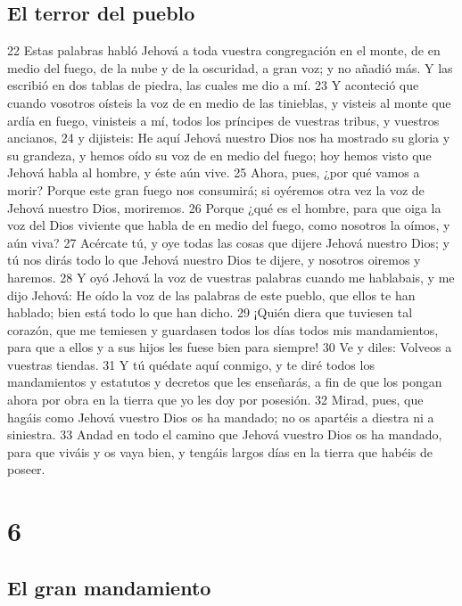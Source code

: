\section{El terror del pueblo }

22 Estas palabras habló Jehová a toda vuestra congregación en el monte, de en medio del fuego, de la nube y de la oscuridad, a gran voz; y no añadió más. Y las escribió en dos tablas de piedra, las cuales me dio a mí.
23 Y aconteció que cuando vosotros oísteis la voz de en medio de las tinieblas, y visteis al monte que ardía en fuego, vinisteis a mí, todos los príncipes de vuestras tribus, y vuestros ancianos,
24 y dijisteis: He aquí Jehová nuestro Dios nos ha mostrado su gloria y su grandeza, y hemos oído su voz de en medio del fuego; hoy hemos visto que Jehová habla al hombre, y éste aún vive.
25 Ahora, pues, ¿por qué vamos a morir? Porque este gran fuego nos consumirá; si oyéremos otra vez la voz de Jehová nuestro Dios, moriremos.
26 Porque ¿qué es el hombre, para que oiga la voz del Dios viviente que habla de en medio del fuego, como nosotros la oímos, y aún viva?
27 Acércate tú, y oye todas las cosas que dijere Jehová nuestro Dios; y tú nos dirás todo lo que Jehová nuestro Dios te dijere, y nosotros oiremos y haremos.
28 Y oyó Jehová la voz de vuestras palabras cuando me hablabais, y me dijo Jehová: He oído la voz de las palabras de este pueblo, que ellos te han hablado; bien está todo lo que han dicho.
29 ¡Quién diera que tuviesen tal corazón, que me temiesen y guardasen todos los días todos mis mandamientos, para que a ellos y a sus hijos les fuese bien para siempre!
30 Ve y diles: Volveos a vuestras tiendas.
31 Y tú quédate aquí conmigo, y te diré todos los mandamientos y estatutos y decretos que les enseñarás, a fin de que los pongan ahora por obra en la tierra que yo les doy por posesión.
32 Mirad, pues, que hagáis como Jehová vuestro Dios os ha mandado; no os apartéis a diestra ni a siniestra.
33 Andad en todo el camino que Jehová vuestro Dios os ha mandado, para que viváis y os vaya bien, y tengáis largos días en la tierra que habéis de poseer.

\chapter{6}


\section{El gran mandamiento}


